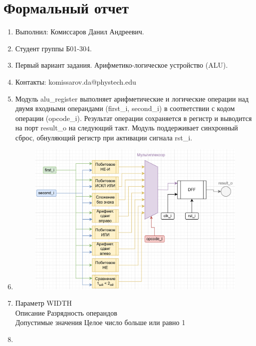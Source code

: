 \documentclass[a4paper,12pt]{article} %
\begin{document}
\section{Формальный отчет}
\begin{enumerate}
    \item Выполнил: Комиссаров Данил Андреевич.
    \item Студент группы Б01-304.
    \item Первый вариант задания. Арифметико-логическое устройство (ALU).
    \item Контакты: komissarov.da@phystech.edu
    \item Модуль alu\_register выполняет арифметические и логические операции над двумя входными операндами (first\_i, second\_i) в соответствии с кодом операции (opcode\_i). Результат операции сохраняется в регистр и выводится на порт result\_o на следующий такт. Модуль поддерживает синхронный сброс, обнуляющий регистр при активации сигнала rst\_i.
    \item
\begin{figure}[H]
    \centering
    \includegraphics[width=1\linewidth]{Formal/АЛУ1.png}
\end{figure}
    \item
Параметр	WIDTH		\\
Описание	Разрядность операндов\\
Допустимые значения Целое число больше или равно 1\\
    \item
    \begin{table}[H]
\centering
\label{tab:ports}
\begin{tabular}{|l|c|l|p{6cm}|}
\hline

\end{tabular}
\end{table}
\end{enumerate}
\end{document}
